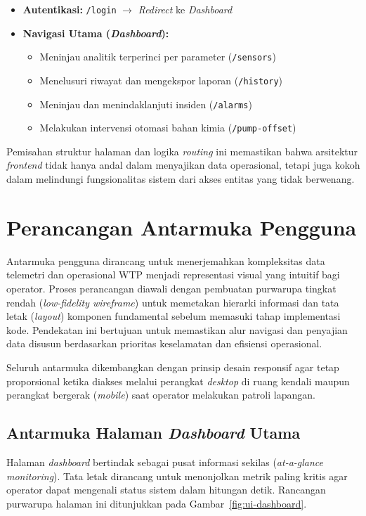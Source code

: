\begin{itemize}
    \item \textbf{Autentikasi:} \texttt{/login} $\rightarrow$ \textit{Redirect} ke \textit{Dashboard}
    \item \textbf{Navigasi Utama (\textit{Dashboard}):} 
    \begin{itemize}
        \item Meninjau analitik terperinci per parameter (\texttt{/sensors})
        \item Menelusuri riwayat dan mengekspor laporan (\texttt{/history})
        \item Meninjau dan menindaklanjuti insiden (\texttt{/alarms})
        \item Melakukan intervensi otomasi bahan kimia (\texttt{/pump-offset})
    \end{itemize}
\end{itemize}

Pemisahan struktur halaman dan logika \textit{routing} ini memastikan bahwa arsitektur \textit{frontend} tidak hanya 
andal dalam menyajikan data operasional, tetapi juga kokoh dalam melindungi fungsionalitas sistem dari akses entitas yang tidak berwenang.

\section{Perancangan Antarmuka Pengguna}
\label{subsec:ui-design}
Antarmuka pengguna dirancang untuk menerjemahkan kompleksitas data telemetri dan operasional WTP menjadi representasi 
visual yang intuitif bagi operator. Proses perancangan diawali dengan pembuatan purwarupa tingkat rendah 
(\textit{low-fidelity wireframe}) untuk memetakan hierarki informasi dan tata letak (\textit{layout}) komponen 
fundamental sebelum memasuki tahap implementasi kode. Pendekatan ini bertujuan untuk memastikan alur navigasi dan 
penyajian data disusun berdasarkan prioritas keselamatan dan efisiensi operasional.

Seluruh antarmuka dikembangkan dengan prinsip desain responsif agar tetap proporsional ketika diakses melalui perangkat 
\textit{desktop} di ruang kendali maupun perangkat bergerak (\textit{mobile}) saat operator melakukan patroli lapangan. 

\subsection{Antarmuka Halaman \textit{Dashboard} Utama}
Halaman \textit{dashboard} bertindak sebagai pusat informasi sekilas (\textit{at-a-glance monitoring}). 
Tata letak dirancang untuk menonjolkan metrik paling kritis agar operator dapat mengenali status sistem dalam 
hitungan detik. Rancangan purwarupa halaman ini ditunjukkan pada Gambar~\ref{fig:ui-dashboard}.

